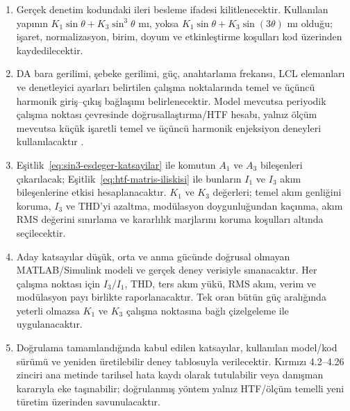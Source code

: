 \begin{enumerate}[leftmargin=*,label=\textbf{Adım \arabic*:}]
  \item Gerçek denetim kodundaki ileri besleme ifadesi kilitlenecektir. Kullanılan yapının $K_1\sin\theta+K_3\sin^3\theta$ mı, yoksa $K_1\sin\theta+K_3\sin(3\theta)$ mı olduğu; işaret, normalizasyon, birim, doyum ve etkinleştirme koşulları kod üzerinden kaydedilecektir.

  \item DA bara gerilimi, şebeke gerilimi, güç, anahtarlama frekansı, LCL elemanları ve denetleyici ayarları belirtilen çalışma noktalarında temel ve üçüncü harmonik giriş--çıkış bağlaşımı belirlenecektir. Model mevcutsa periyodik çalışma noktası çevresinde doğrusallaştırma/HTF hesabı, yalnız ölçüm mevcutsa küçük işaretli temel ve üçüncü harmonik enjeksiyon deneyleri kullanılacaktır \citep{Wereley1991,Liao2022}.

  \item Eşitlik~\eqref{eq:sin3-esdeger-katsayilar} ile komutun $A_1$ ve $A_3$ bileşenleri çıkarılacak; Eşitlik~\eqref{eq:htf-matris-iliskisi} ile bunların $I_1$ ve $I_3$ akım bileşenlerine etkisi hesaplanacaktır. $K_1$ ve $K_3$ değerleri; temel akım genliğini koruma, $I_3$ ve THD'yi azaltma, modülasyon doygunluğundan kaçınma, akım RMS değerini sınırlama ve kararlılık marjlarını koruma koşulları altında seçilecektir.

  \item Aday katsayılar düşük, orta ve anma gücünde doğrusal olmayan MATLAB/Simulink modeli ve gerçek deney verisiyle sınanacaktır. Her çalışma noktası için $I_3/I_1$, THD, ters akım yükü, RMS akım, verim ve modülasyon payı birlikte raporlanacaktır. Tek oran bütün güç aralığında yeterli olmazsa $K_1$ ve $K_3$ çalışma noktasına bağlı çizelgeleme ile uygulanacaktır.

  \item Doğrulama tamamlandığında kabul edilen katsayılar, kullanılan model/kod sürümü ve yeniden üretilebilir deney tablosuyla verilecektir. Kırmızı 4.2--4.26 zinciri ana metinde tarihsel hata kaydı olarak tutulabilir veya danışman kararıyla eke taşınabilir; doğrulanmış yöntem yalnız HTF/ölçüm temelli yeni türetim üzerinden savunulacaktır.
\end{enumerate}

